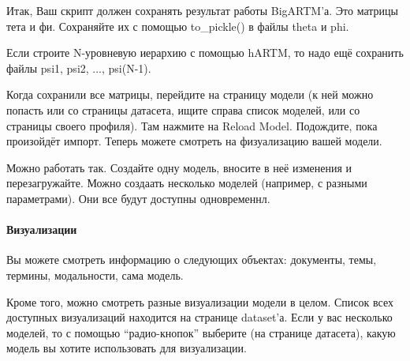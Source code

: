 \documentclass[letterpaper,10pt,english]{sphinxmanual}
\begin{document}
Итак, Ваш скрипт должен сохранять результат работы BigARTM'а. Это матрицы тета и фи. Сохраняйте их с помощью to\_pickle() в файлы theta и phi.

Если строите N-уровневую иерархию с помощью hARTM, то надо ещё сохранить файлы psi1, psi2, ..., psi(N-1).

Когда сохранили все матрицы, перейдите на страницу модели (к ней можно попасть или со страницы датасета, ищите справа список моделей,
или со страницы своего профиля). Там нажмите на Reload Model. Подождите, пока произойдёт импорт. Теперь можете смотреть на физуализацию вашей модели.

Можно работать так. Создайте одну модель, вносите в неё изменения и перезагружайте.
Можно создаать несколько моделей (например, с разными параметрами). Они все будут доступны одновременнл.
\paragraph{Визуализации}

Вы можете смотреть информацию о следующих объектах: документы, темы, термины, модальности, сама модель.

Кроме того, можно смотреть разные визуализации модели в целом. Список всех доступных визуализаций находится на странице dataset'а.
Если у вас несколько моделей, то с помощью ``радио-кнопок'' выберите (на странице датасета), какую модель вы хотите использовать для визуализации.



\renewcommand{\indexname}{Index}
\printindex
\end{document}
